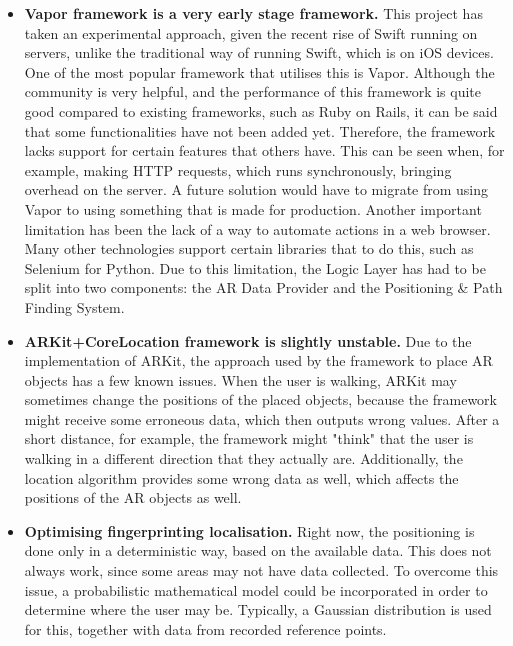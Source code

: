 \begin{itemize}
    \item \textbf{Vapor framework is a very early stage framework.}\newline
    This project has taken an experimental approach, given the recent rise of Swift running on servers, unlike the traditional way of running Swift, which is on iOS devices. One of the most popular framework that utilises this is Vapor. Although the community is very helpful, and the performance of this framework is quite good compared to existing frameworks, such as Ruby on Rails, it can be said that some functionalities have not been added yet. Therefore, the framework lacks support for certain features that others have. This can be seen when, for example, making HTTP requests, which runs synchronously, bringing overhead on the server. A future solution would have to migrate from using Vapor to using something that is made for production. Another important limitation has been the lack of a way to automate actions in a web browser. Many other technologies support certain libraries that to do this, such as Selenium for Python. Due to this limitation, the Logic Layer has had to be split into two components: the AR Data Provider and the Positioning \& Path Finding System.
    
    \item \textbf{ARKit+CoreLocation framework is slightly unstable.}\newline
    Due to the implementation of ARKit, the approach used by the framework to place AR objects has a few known issues. When the user is walking, ARKit may sometimes change the positions of the placed objects, because the framework might receive some erroneous data, which then outputs wrong values. After a short distance, for example, the framework might "think" that the user is walking in a different direction that they actually are. Additionally, the location algorithm provides some wrong data as well, which affects the positions of the AR objects as well.
    
    \item \textbf{Optimising fingerprinting localisation.}\newline
    Right now, the positioning is done only in a deterministic way, based on the available data. This does not always work, since some areas may not have data collected. To overcome this issue, a probabilistic mathematical model could be incorporated in order to determine where the user may be. Typically, a Gaussian distribution is used for this, together with data from recorded reference points. 
    

\end{itemize}
